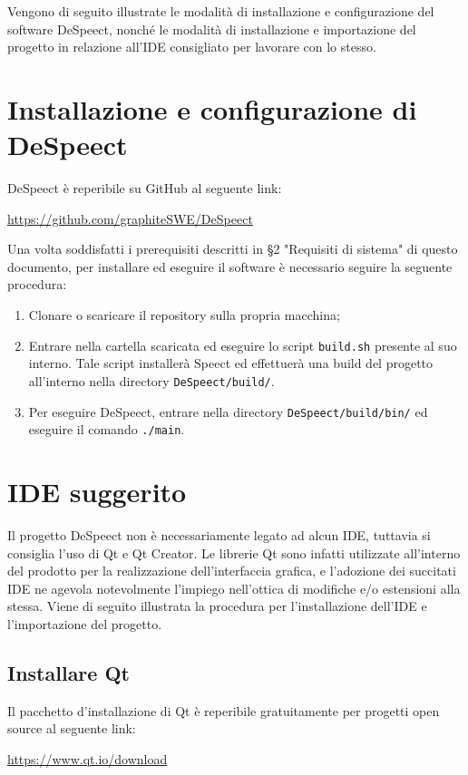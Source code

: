 \documentclass[openany,12pt,a4paper]{report}
\begin{document}
	Vengono di seguito illustrate le modalità di installazione e configurazione del software DeSpeect, nonché le modalità di installazione e importazione del progetto in relazione all'IDE consigliato per lavorare con lo stesso.
	
	\section{Installazione e configurazione di DeSpeect}
	
	DeSpeect è reperibile su GitHub al seguente link:
	\begin{center}
		\url{https://github.com/graphiteSWE/DeSpeect}
	\end{center}
	
	\noindent Una volta soddisfatti i prerequisiti descritti in §2 "Requisiti di sistema" di questo documento, per installare ed eseguire il software è necessario seguire la seguente procedura:
	\begin{enumerate}
		\item Clonare o scaricare il repository sulla propria macchina;
		\item Entrare nella cartella scaricata ed eseguire lo script \verb|build.sh| presente al suo interno. Tale script installerà Speect ed effettuerà una build del progetto all'interno nella directory \verb|DeSpeect/build/|.
		\item Per eseguire DeSpeect, entrare nella directory \verb|DeSpeect/build/bin/| ed eseguire il comando \verb|./main|.
	\end{enumerate}
	
	\section{IDE suggerito}
	Il progetto DeSpeect non è necessariamente legato ad alcun IDE, tuttavia si consiglia l'uso di Qt e Qt Creator. Le librerie Qt sono infatti utilizzate all'interno del prodotto per la realizzazione dell'interfaccia grafica, e l'adozione dei succitati IDE ne agevola notevolmente l'impiego nell'ottica di modifiche e/o estensioni alla stessa. Viene di seguito illustrata la procedura per l'installazione dell'IDE e l'importazione del progetto.
	
	\subsection{Installare Qt}
	
	Il pacchetto d'installazione di Qt è reperibile gratuitamente per progetti open source al seguente link:
	\begin{center}
		\url{https://www.qt.io/download}
	\end{center}
	
\end{document}
